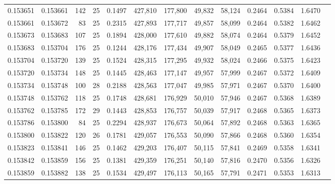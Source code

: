 \begin{tabular}{rrrrrrrrrrrrr}
0.153651 & 0.153661 & 142 &  25 &                                     0.1497 & 427,810 & 177,800 &  49,832 &  58,124 & 0.2464 & 0.5384 & 1.6470 \\
0.153661 & 0.153672 &  83 &  25 &                                     0.2315 & 427,893 & 177,717 &  49,857 &  58,099 & 0.2464 & 0.5382 & 1.6462 \\
0.153673 & 0.153683 & 107 &  25 &                                     0.1894 & 428,000 & 177,610 &  49,882 &  58,074 & 0.2464 & 0.5379 & 1.6452 \\
0.153683 & 0.153704 & 176 &  25 &                                     0.1244 & 428,176 & 177,434 &  49,907 &  58,049 & 0.2465 & 0.5377 & 1.6436 \\
0.153704 & 0.153720 & 139 &  25 &                                     0.1524 & 428,315 & 177,295 &  49,932 &  58,024 & 0.2466 & 0.5375 & 1.6423 \\
0.153720 & 0.153734 & 148 &  25 &                                     0.1445 & 428,463 & 177,147 &  49,957 &  57,999 & 0.2467 & 0.5372 & 1.6409 \\
0.153734 & 0.153748 & 100 &  28 &                                     0.2188 & 428,563 & 177,047 &  49,985 &  57,971 & 0.2467 & 0.5370 & 1.6400 \\
0.153748 & 0.153762 & 118 &  25 &                                     0.1748 & 428,681 & 176,929 &  50,010 &  57,946 & 0.2467 & 0.5368 & 1.6389 \\
0.153762 & 0.153785 & 172 &  29 &                                     0.1443 & 428,853 & 176,757 &  50,039 &  57,917 & 0.2468 & 0.5365 & 1.6373 \\
0.153786 & 0.153800 &  84 &  25 &                                     0.2294 & 428,937 & 176,673 &  50,064 &  57,892 & 0.2468 & 0.5363 & 1.6365 \\
0.153800 & 0.153822 & 120 &  26 &                                     0.1781 & 429,057 & 176,553 &  50,090 &  57,866 & 0.2468 & 0.5360 & 1.6354 \\
0.153823 & 0.153841 & 146 &  25 &                                     0.1462 & 429,203 & 176,407 &  50,115 &  57,841 & 0.2469 & 0.5358 & 1.6341 \\
0.153842 & 0.153859 & 156 &  25 &                                     0.1381 & 429,359 & 176,251 &  50,140 &  57,816 & 0.2470 & 0.5356 & 1.6326 \\
0.153859 & 0.153882 & 138 &  25 &                                     0.1534 & 429,497 & 176,113 &  50,165 &  57,791 & 0.2471 & 0.5353 & 1.6313 \\

\end{tabular}
